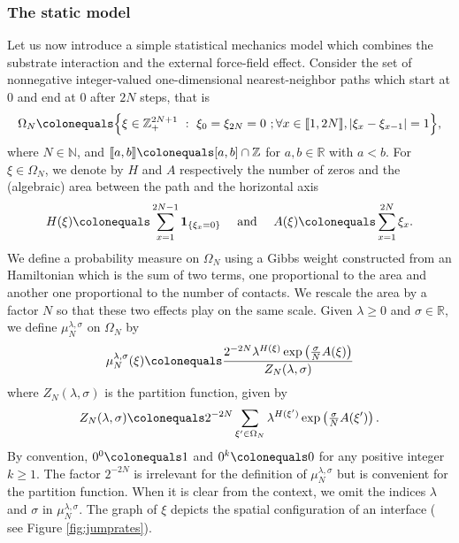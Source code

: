 \documentclass[reqno,11pt]{amsart}
\numberwithin{equation}{section}
\newcommand{\bbR}{{\ensuremath{\mathbb R}} }
\newcommand{\gO}{\Omega}
\newcommand{\gl}{\lambda}
\newcommand{\ind}{\mathbf{1}}
\newcommand{\lint}{\llbracket}
\newcommand{\rint}{\rrbracket}
\newcommand{\intp}[1]{\lint #1 \rint}
\begin{document}
\subsubsection{The static model}
Let us now introduce a simple statistical mechanics model which combines the substrate interaction and the external force-field effect.
Consider the set of nonnegative integer-valued one-dimensional nearest-neighbor paths   which start at $0$ and end at $0$ after $2N$ steps, that is
 \begin{equation}
\Omega_N \colonequals \Big\{\xi\in \mathbb{Z}_+^{2N+1} \ : \   \xi_0=\xi_{2N}=0 \ ;  \forall x \in \lint 1, 2N \rint, \vert \xi_{x}-\xi_{x-1}\vert=1 \Big\}, \label{defomegaN}
\end{equation}
where $N\in \mathbb{N}$, and $\intp{a, b}\colonequals[a, b] \cap \mathbb{Z}$ for $a, b \in \mathbb{R}$ with $a<b$.
For $\xi\in \Omega_N$, we  denote by $H$ and $A$ respectively the number of zeros and the (algebraic) area between the path and the horizontal axis
\begin{equation*}
H(\xi)\colonequals\sum_{x=1}^{2N-1} \ind_{\{\xi_{x}=0\}} \quad  \text{ and } \quad   A(\xi)\colonequals\sum_{x=1}^{2N}\xi_x. 
\end{equation*}
 We define a probability measure on $\gO_N$ using a Gibbs weight constructed from an Hamiltonian which is the sum of two terms, one proportional to the area and another one proportional to the number of contacts. We rescale the area by a factor $N$ so that these two effects play on the same scale. Given $\gl \ge 0$ and $\sigma\in \bbR$,
we define $\mu_N^{\lambda, \sigma}$ on $\Omega_N$ by
\begin{equation}\label{defmun}
\mu_N^{\lambda, \sigma}(\xi) \colonequals \frac{2^{-2N} \lambda^{H(\xi)} \exp\left({\tfrac{\sigma}{N}A(\xi)}\right)}{Z_N(\lambda, \sigma)} 
\end{equation}
where $Z_N(\lambda, \sigma)$ is the partition function, given by
\begin{equation}
Z_N(\lambda, \sigma)\colonequals 2^{-2N} \sum_{\xi' \in \Omega_N} \lambda^{H(\xi')} \exp\left(\tfrac{\sigma}{N} A(\xi')\right).
\end{equation}
By convention,  $0^0 \colonequals 1$ and $0^k \colonequals 0$ for any positive integer $k\geq 1$.
 The factor $2^{-2N}$ is irrelevant for the definition of $\mu_N^{\lambda, \sigma}$ but is convenient for the partition function. 
When it is clear  from the context, we omit the indices $\lambda$ and $\sigma$ in $\mu_N^{\lambda, \sigma}$. 
The graph of $\xi$ depicts the spatial configuration of an interface ( see Figure \ref{fig:jumprates}). 
\end{document}
